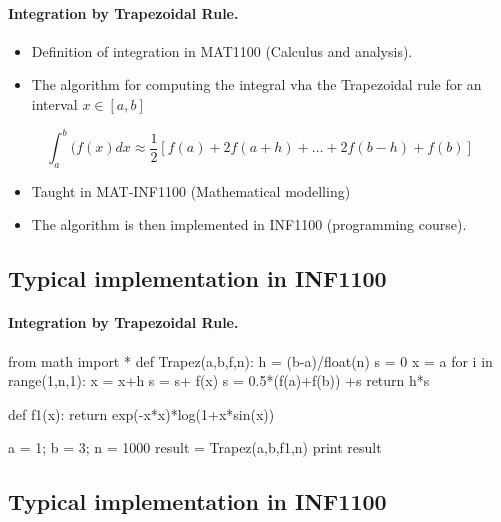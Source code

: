 \documentclass[%
twoside,                 %
final,                   %
10pt]{article}
\begin{document}
\paragraph{Integration by Trapezoidal Rule.}

\begin{itemize}
\item Definition of integration  in MAT1100 (Calculus and analysis).

\item The algorithm for computing the  integral vha the Trapezoidal rule for an interval $x \in [a,b]$
\end{itemize}

\noindent
\[
  \int_a^b(f(x) dx \approx \frac{1}{2}\left [f(a)+2f(a+h)+\dots+2f(b-h)+f(b)\right] 
\]
\begin{itemize}
\item Taught   in MAT-INF1100  (Mathematical modelling)

\item The algorithm is then implemented in  INF1100 (programming course).
\end{itemize}

\noindent



\subsection{Typical implementation in INF1100}

\paragraph{Integration by Trapezoidal Rule.}

\bpycod
from math import *
def Trapez(a,b,f,n):
   h = (b-a)/float(n)
   s = 0
   x = a
   for i in range(1,n,1):
       x = x+h
       s = s+ f(x)
   s = 0.5*(f(a)+f(b)) +s
   return h*s

def f1(x):
    return exp(-x*x)*log(1+x*sin(x))

a = 1;  b = 3; n = 1000
result = Trapez(a,b,f1,n)
print result
\epycod




\subsection{Typical implementation in INF1100}
\end{document}
